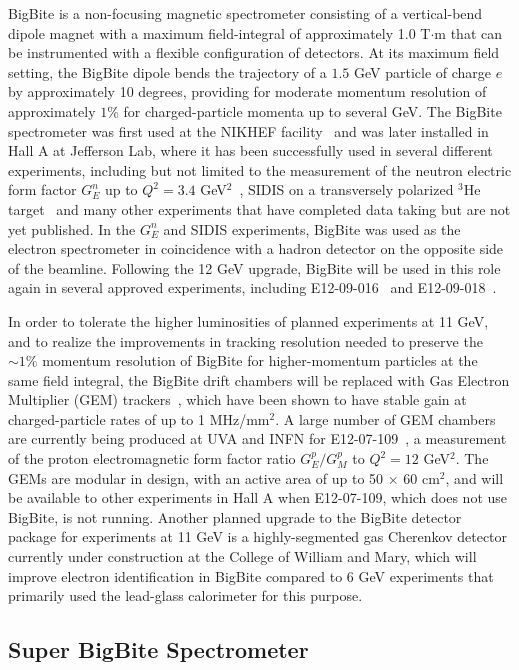 BigBite is a non-focusing magnetic spectrometer consisting of a vertical-bend dipole magnet with a maximum field-integral of approximately 1.0 T$\cdot$m that can be instrumented with a flexible configuration of detectors. At its maximum field setting, the BigBite dipole bends the trajectory of a $1.5$ GeV particle of charge $e$ by approximately 10 degrees, providing for moderate momentum resolution of approximately $1\%$ for charged-particle momenta up to several GeV. The BigBite spectrometer was first used at the NIKHEF facility~\cite{BigBite1998,BigBiteOptics1998} and was later installed in Hall A at Jefferson Lab, where it has been successfully used in several different experiments, including but not limited to the measurement of the neutron electric form factor $G_E^n$ up to $Q^2 = 3.4$ GeV$^2$~\cite{GEN2010}, SIDIS on a transversely polarized $^3$He target~\cite{E06010_AUT_PRL} and many other experiments that have completed data taking but are not yet published. In the $G_E^n$ and SIDIS experiments, BigBite was used as the electron spectrometer in coincidence with a hadron detector on the opposite side of the beamline. Following the 12 GeV upgrade, BigBite will be used in this role again in several approved experiments, including E12-09-016~\cite{GEN2} and E12-09-018~\cite{SBS_SIDIS}.

In order to tolerate the higher luminosities of planned experiments at 11 GeV, and to realize the improvements in tracking resolution needed to preserve the $\sim1\%$ momentum resolution of BigBite for higher-momentum particles at the same field integral, the BigBite drift chambers will be replaced with Gas Electron Multiplier (GEM) trackers~\cite{Sauli_GEM, GEM_test_1999}, which have been shown to have stable gain at charged-particle rates of up to 1 MHz/mm$^2$. A large number of GEM chambers are currently being produced at UVA and INFN for E12-07-109~\cite{GEP5}, a measurement of the proton electromagnetic form factor ratio $G_E^p/G_M^p$ to $Q^2 = 12$ GeV$^2$. The GEMs are modular in design, with an active area of up to 50 $\times$ 60 cm$^2$, and will be available to other experiments in Hall A when E12-07-109, which does not use BigBite, is not running. Another planned upgrade to the BigBite detector package for experiments at 11 GeV is a highly-segmented gas Cherenkov detector currently under construction at the College of William and Mary, which will improve electron identification in BigBite compared to 6 GeV experiments that primarily used the lead-glass calorimeter for this purpose.
\subsection{Super BigBite Spectrometer}

